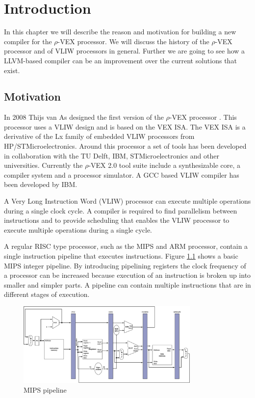 \chapter{Introduction}
\label{chap:introduction}
In this chapter we will describe the reason and motivation for building a new compiler for the $\rho$-VEX processor. We will discuss the history of the $\rho$-VEX processor and of VLIW processors in general. Further we are going to see how a LLVM-based compiler can be an improvement over the current solutions that exist.

\section{Motivation}
In 2008 Thijs van As designed the first version of the $\rho$-VEX processor \cite{As:2008rt}. This processor uses a VLIW design and is based on the VEX ISA. The VEX ISA is a derivative of the Lx family of embedded VLIW processors \cite{854391} from HP/STMicroelectronics.
Around this processor a set of tools has been developed in collaboration with the TU Delft, IBM, STMicroelectronics and other universities. Currently the $\rho$-VEX 2.0 tool suite include a synthesizable core, a compiler system and a processor simulator. A GCC based VLIW compiler has been developed by IBM.

A Very Long Instruction Word (VLIW) processor can execute multiple operations during a single clock cycle. A compiler is required to find parallelism between instructions and to provide scheduling that enables the VLIW processor to execute multiple operations during a single cycle.

A regular RISC type processor, such as the MIPS and ARM processor, contain a single instruction pipeline that executes instructions. Figure \ref{fig:mips_pipe} shows a basic MIPS integer pipeline. By introducing pipelining registers the clock frequency of a processor can be increased because execution of an instruction is broken up into smaller and simpler parts. A pipeline can contain multiple instructions that are in different stages of execution.

\begin{figure}[ht]
\centering
\includegraphics[width=0.8\textwidth]{1_introduction/img/MIPS_pipe.png}
\caption{MIPS pipeline \cite{John-L.-Hennessy:2009wq}}
\label{fig:mips_pipe}
\end{figure}

